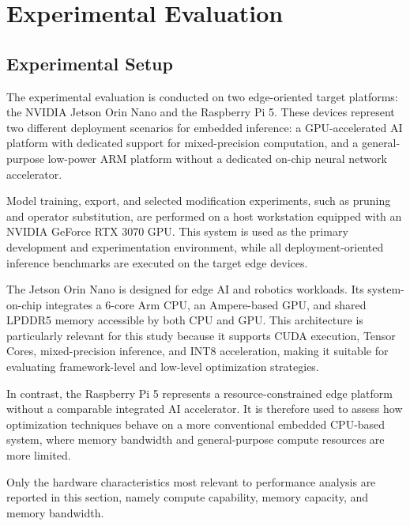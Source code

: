 \documentclass[12pt,a4paper]{report}
\begin{document}
\chapter{Experimental Evaluation}
\noindent


\section{Experimental Setup}

The experimental evaluation is conducted on two edge-oriented target platforms: the NVIDIA Jetson Orin Nano and the
Raspberry Pi 5. These devices represent two different deployment scenarios for embedded inference: a GPU-accelerated
AI platform with dedicated support for mixed-precision computation, and a general-purpose low-power ARM platform
without a dedicated on-chip neural network accelerator.

Model training, export, and selected modification experiments, such as pruning and operator substitution, are performed
on a host workstation equipped with an NVIDIA GeForce RTX 3070 GPU. This system is used as the primary development
and experimentation environment, while all deployment-oriented inference benchmarks are executed on the target edge
devices.

The Jetson Orin Nano is designed for edge AI and robotics workloads. Its system-on-chip integrates a 6-core Arm CPU,
an Ampere-based GPU, and shared LPDDR5 memory accessible by both CPU and GPU. This architecture is particularly
relevant for this study because it supports CUDA execution, Tensor Cores, mixed-precision inference, and INT8
acceleration, making it suitable for evaluating framework-level and low-level optimization strategies.

In contrast, the Raspberry Pi 5 represents a resource-constrained edge platform without a comparable integrated AI
accelerator. It is therefore used to assess how optimization techniques behave on a more conventional embedded
CPU-based system, where memory bandwidth and general-purpose compute resources are more limited.

Only the hardware characteristics most relevant to performance analysis are reported in this section, namely compute
capability, memory capacity, and memory bandwidth.
\end{document}
